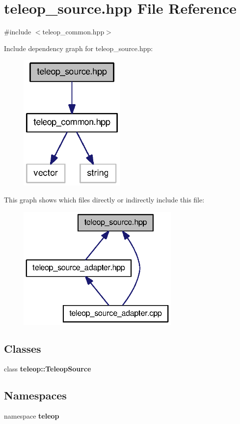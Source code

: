 \section{teleop\_\-source.hpp File Reference}
\label{teleop__source_8hpp}
{\ttfamily \#include $<$teleop\_\-common.hpp$>$}\par
Include dependency graph for teleop\_\-source.hpp:
\nopagebreak
\begin{figure}[H]
\begin{center}
\leavevmode
\includegraphics[width=148pt]{teleop__source_8hpp__incl}
\end{center}
\end{figure}
This graph shows which files directly or indirectly include this file:
\nopagebreak
\begin{figure}[H]
\begin{center}
\leavevmode
\includegraphics[width=225pt]{teleop__source_8hpp__dep__incl}
\end{center}
\end{figure}
\subsection*{Classes}
\begin{DoxyCompactItemize}
\item 
class {\bf teleop::TeleopSource}
\end{DoxyCompactItemize}
\subsection*{Namespaces}
\begin{DoxyCompactItemize}
\item 
namespace {\bf teleop}
\end{DoxyCompactItemize}
